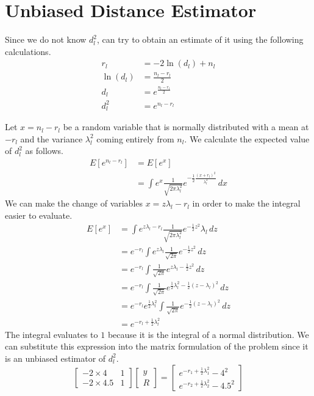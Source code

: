 \documentclass[12pt]{article}
\begin{document}
\section{Unbiased Distance Estimator}

Since we do not know \(d_l^2\), can try to obtain an estimate of it using the following calculations.
\begin{align*}
    r_l&=-2\ln(d_l) + n_l\\
    \ln(d_l)&=\frac{n_l-r_l}{2}\\
    d_l &= e^{\frac{n_l-r_l}{2}}\\
    d_l^2 &= e^{n_l-r_l}
\end{align*}

Let \(x=n_l-r_l\) be a random variable that is normally distributed with a mean at \(-r_l\)
and the variance \(\lambda_l^2\) coming entirely from \(n_l\). We calculate the expected value
of \(d_l^2\) as follows.
\begin{align*}
    E\left[e^{n_l-r_l}\right] &= E\left[e^x\right]\\
    &=\int e^x \frac{1}{\sqrt{2\pi\lambda_l^2}}e^{-\frac{1}{2}\frac{(x+r_l)^2}{\lambda_l^2}}\,dx
\end{align*}
We can make the change of variables \(x=z\lambda_l - r_l\) in order to make the integral easier
to evaluate.
\begin{align*}
    E\left[e^x\right] &= \int e^{z\lambda_l - r_l}\frac{1}{\sqrt{2\pi\lambda_l^2}}e^{-\frac{1}{2}z^2}\lambda_l\,dz\\
    &=e^{-r_l}\int e^{z\lambda_l}\frac{1}{\sqrt{2\pi}}e^{-\frac{1}{2}z^2}\,dz\\
    &=e^{-r_l}\int \frac{1}{\sqrt{2\pi}}e^{z\lambda_l-\frac{1}{2}z^2}\,dz\\
    &=e^{-r_l}\int \frac{1}{\sqrt{2\pi}}e^{\frac{1}{2}\lambda_l^2 - \frac{1}{2}(z-\lambda_l)^2}\,dz\\
    &=e^{-r_l}e^{\frac{1}{2}\lambda_l^2} \int\frac{1}{\sqrt{2\pi}}e^{-\frac{1}{2}(z-\lambda_l)^2}\,dz\\
    &=e^{-r_l+\frac{1}{2}\lambda_l^2}
\end{align*}
The integral evaluates to \(1\) because it is the integral of a normal distribution. We can substitute
this expression into the matrix formulation of the problem since it is an unbiased estimator of \(d_l^2\).
\[\begin{bmatrix}-2\times4 & 1\\-2\times4.5 & 1\end{bmatrix}\begin{bmatrix}y\\R\end{bmatrix}
=\begin{bmatrix}e^{-r_1+\frac{1}{2}\lambda_1^2}-4^2\\e^{-r_2+\frac{1}{2}\lambda_2^2}-4.5^2\end{bmatrix}\]
\end{document}
